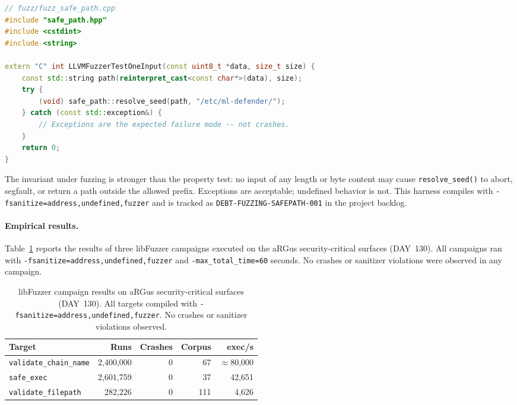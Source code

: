 \documentclass[11pt,a4paper]{article}
\begin{document}
    \begin{lstlisting}[language=C++,
        caption={Minimal libFuzzer harness for the safe\_path resolve\_seed() function},
        basicstyle=\ttfamily\small, breaklines=true]
// fuzz/fuzz_safe_path.cpp
#include "safe_path.hpp"
#include <cstdint>
#include <string>

extern "C" int LLVMFuzzerTestOneInput(const uint8_t *data, size_t size) {
    const std::string path(reinterpret_cast<const char*>(data), size);
    try {
        (void) safe_path::resolve_seed(path, "/etc/ml-defender/");
    } catch (const std::exception&) {
        // Exceptions are the expected failure mode -- not crashes.
    }
    return 0;
}
    \end{lstlisting}

    The invariant under fuzzing is stronger than the property test: no input of
    any length or byte content may cause \texttt{resolve\_seed()} to abort,
    segfault, or return a path outside the allowed prefix. Exceptions are
    acceptable; undefined behavior is not. This harness compiles with
    \texttt{-fsanitize=address,undefined,fuzzer} and is tracked as
    \texttt{DEBT-FUZZING-SAFEPATH-001} in the project backlog.

    \paragraph{Empirical results.}
    Table~\ref{tab:fuzzing-results} reports the results of three libFuzzer
    campaigns executed on the aRGus security-critical surfaces (DAY~130).
    All campaigns ran with \texttt{-fsanitize=address,undefined,fuzzer} and
    \texttt{-max\_total\_time=60} seconds. No crashes or sanitizer violations
    were observed in any campaign.

    \begin{table}[h]
        \centering
        \caption{libFuzzer campaign results on aRGus security-critical surfaces (DAY~130).
        All targets compiled with \texttt{-fsanitize=address,undefined,fuzzer}.
        No crashes or sanitizer violations observed.}
        \label{tab:fuzzing-results}
        \begin{tabular}{lrrrr}
            \toprule
            \textbf{Target} & \textbf{Runs} & \textbf{Crashes} & \textbf{Corpus} & \textbf{exec/s} \\
            \midrule
            \texttt{validate\_chain\_name} & 2{,}400{,}000 & 0 & 67 & $\approx$80{,}000 \\
            \texttt{safe\_exec} & 2{,}601{,}759 & 0 & 37 & 42{,}651 \\
            \texttt{validate\_filepath} & 282{,}226 & 0 & 111 & 4{,}626 \\
            \bottomrule
        \end{tabular}
    \end{table}
\end{document}
